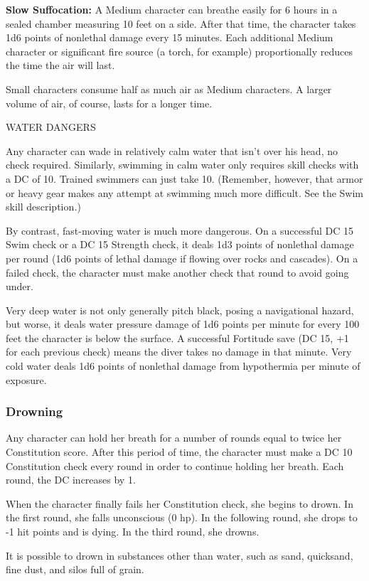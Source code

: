 \documentclass{article}
\begin{document}
\textbf{Slow Suffocation:} A Medium character can breathe easily for 6 hours in 
a sealed chamber measuring 10 feet on a side. After that time, the character takes 
1d6 points of nonlethal damage every 15 minutes. Each additional Medium character 
or significant fire source (a torch, for example) proportionally reduces the time 
the air will last.

Small characters consume half as much air as Medium characters. A larger volume 
of air, of course, lasts for a longer time. 

\vspace{12pt}
WATER DANGERS

Any character can wade in relatively calm water that isn't over his head, no check 
required. Similarly, swimming in calm water only requires skill checks with a DC 
of 10. Trained swimmers can just take 10. (Remember, however, that armor or heavy 
gear makes any attempt at swimming much more difficult. See the Swim skill description\textit{.})

By contrast, fast-moving water is much more dangerous. On a successful DC 15 Swim 
check or a DC 15 Strength check, it deals 1d3 points of nonlethal damage per round 
(1d6 points of lethal damage if flowing over rocks and cascades). On a failed check, 
the character must make another check that round to avoid going under.

Very deep water is not only generally pitch black, posing a navigational hazard, 
but worse, it deals water pressure damage of 1d6 points per minute for every 100 
feet the character is below the surface. A successful Fortitude save (DC 15, +1 
for each previous check) means the diver takes no damage in that minute. Very cold 
water deals 1d6 points of nonlethal damage from hypothermia per minute of exposure.

\subsubsection*{\textbf{Drowning}}

Any character can hold her breath for a number of rounds equal to twice her Constitution 
score. After this period of time, the character must make a DC 10 Constitution 
check every round in order to continue holding her breath. Each round, the DC increases 
by 1. 

When the character finally fails her Constitution check, she begins to drown. In 
the first round, she falls unconscious (0 hp). In the following round, she drops 
to -1 hit points and is dying. In the third round, she drowns.

It is possible to drown in substances other than water, such as sand, quicksand, 
fine dust, and silos full of grain.

\newpage
\end{document}

